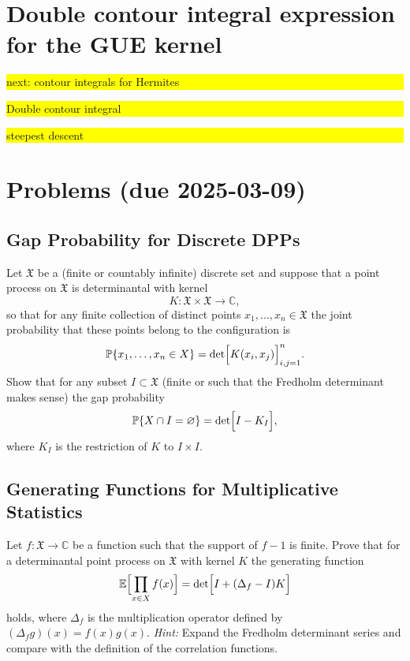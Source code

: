 \documentclass[letterpaper,11pt,oneside,reqno]{article}
\numberwithin{equation}{section}
\theoremstyle{definition}
\begin{document}
\section{Double contour integral expression for the GUE kernel}

\colorbox{yellow}{\parbox{.7\textwidth}{next: contour integrals for Hermites}}

\colorbox{yellow}{\parbox{.7\textwidth}{Double contour integral}}

\colorbox{yellow}{\parbox{.7\textwidth}{steepest descent}}





























\appendix
\setcounter{section}{4}

\section{Problems (due 2025-03-09)}


\subsection{Gap Probability for Discrete DPPs}
Let \(\mathfrak{X}\) be a (finite or countably infinite) discrete set and suppose that a point process on \(\mathfrak{X}\) is determinantal with kernel
\[
K : \mathfrak{X}\times\mathfrak{X}\to\mathbb{C},
\]
so that for any finite collection of distinct points \(x_1,\dots,x_n\in \mathfrak{X}\) the joint probability that these points belong to the configuration is
\[
\mathbb{P}\{x_1,\dots,x_n\in X\}=\det\Bigl[K(x_i,x_j)\Bigr]_{i,j=1}^n.
\]
Show that for any subset \(I\subset\mathfrak{X}\) (finite or such that the Fredholm determinant makes sense) the gap probability
\[
\mathbb{P}\{X\cap I=\varnothing\}=\det\Bigl[I-K_I\Bigr],
\]
where \(K_I\) is the restriction of \(K\) to \(I\times I\).


\subsection{Generating Functions for Multiplicative Statistics}
Let \(f:\mathfrak{X}\to\mathbb{C}\) be a function such that the support of \(f-1\) is finite. Prove that for a determinantal point process on \(\mathfrak{X}\) with kernel \(K\) the generating function
\[
\mathbb{E}\Bigl[\prod_{x\in X} f(x)\Bigr] = \det\Bigl[I+(\Delta_f-I)K\Bigr]
\]
holds, where \(\Delta_f\) is the multiplication operator defined by \((\Delta_f g)(x)=f(x)g(x)\).
\emph{Hint:} Expand the Fredholm determinant series and compare with the definition of the correlation functions.
\end{document}
